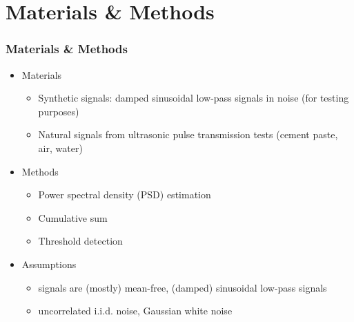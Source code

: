 \documentclass[11pt,aspectratio=169]{beamer}
\begin{document}
	\section{Materials \& Methods}
	\begin{frame}
		\frametitle{Materials \& Methods}
		\begin{itemize}
			\item \parbox{20mm}{\textcolor{RIPtitlecol}{Materials}}
				\begin{itemize}
					\item Synthetic signals: damped sinusoidal low-pass signals in noise (for testing purposes)
					\item Natural signals from ultrasonic pulse transmission tests (cement paste, air, water)
				\end{itemize}
			\item \parbox{20mm}{\textcolor{RIPtitlecol}{Methods}}
				\begin{itemize}
					\item Power spectral density (PSD) estimation
					\item Cumulative sum
					\item Threshold detection
				\end{itemize}
			\item \parbox{20mm}{\textcolor{RIPtitlecol}{Assumptions}}
			\begin{itemize}
				\item signals are (mostly) mean-free, (damped) sinusoidal low-pass signals
				\item uncorrelated i.i.d. noise, Gaussian white noise
			\end{itemize}
		\end{itemize}
	\end{frame}
\end{document}
